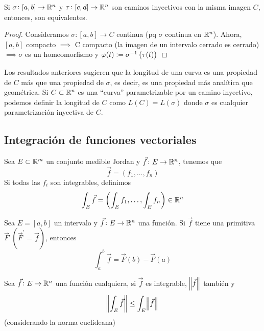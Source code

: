 \begin{prop}
    Si $\sigma \colon [a, b] \to \mathbb{R}^n$ y $\tau \colon [c,d] \to \mathbb{R}^n$ son caminos inyectivos con la misma imagen $C$, entonces, son equivalentes.
\end{prop}

\begin{proof}
    Consideramos $\sigma \colon [a,b] \to C$ continua (pq $\sigma$ continua en $\mathbb{R}^n$). Ahora, $[a, b]$ compacto $\implies$ C compacto
    (la imagen de un intervalo cerrado es cerrado) $\implies \sigma$ es un homeomorfismo y $\varphi(t) := \sigma^{-1}\left( \tau(t) \right)$
\end{proof}

\begin{obs}
    Los resultados anteriores sugieren que la longitud de una curva es una propiedad de $C$ más que una propiedad de $\sigma$, es decir,
    es una propiedad más analítica que geom\'etrica. Si $C \subset \mathbb{R}^n$ es una ``curva'' parametrizable por un camino inyectivo,
    podemos definir la longitud de $C$ como $L(C) = L(\sigma)$ donde $\sigma$ es cualquier parametrización inyectiva de $C$.
\end{obs}

\subsection*{Integración de funciones vectoriales}

\begin{defi*}
    Sea $E \subset \mathbb{R}^m$ un conjunto medible Jordan y $\vec{f} \colon E \to \mathbb{R}^n$, tenemos que
    \[
        \vec{f} = \left( f_1,\dots, f_n \right)
    \]
    Si todas las $f_i$ son integrables, definimos
    \[
        \int_E \vec{f} = \left( \int_E f_1 , \dots, \int_E f_n \right) \in \mathbb{R}^n
    \]
\end{defi*}

\begin{prop*}\label{prop:regla_barrow}
    Sea $E = [a, b]$ un intervalo y $\vec{f} \colon E \to \mathbb{R}^n$ una función. Si $\vec{f}$ tiene una primitiva $\vec{F}$
    $\left( \vec{F}^\prime = \vec{f}\right)$, entonces
    \[
        \int^b_a \vec{f} = \vec{F}(b) - \vec{F}(a)
    \]
\end{prop*}

\begin{prop*}
    Sea $\vec{f} \colon E \to \mathbb{R}^n$ una función cualquiera, si $\vec{f}$ es integrable, $\norm{\vec{f}}$ tambi\'en y
    \[
        \norm{\int_E \vec{f}} \leq \int_E \norm{\vec{f}}
    \]
    (considerando la norma euclideana)
\end{prop*}

